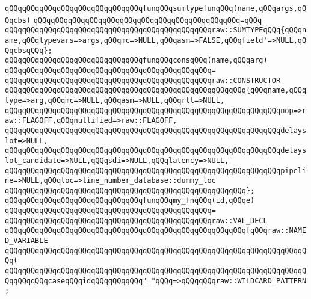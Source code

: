 \newline
\verb|qQQqqQQqqQQqqQQqqQQqqQQqqQQqqQQqfunqQQqsumtypefunqQQq(name,qQQqargs,qQQqcbs)|\newline
\verb|qQQqqQQqqQQqqQQqqQQqqQQqqQQqqQQqqQQqqQQqqQQqqQQq=qQQq|\newline
\verb|qQQqqQQqqQQqqQQqqQQqqQQqqQQqqQQqqQQqqQQqqQQqqQQqraw::SUMTYPEqQQq{qQQqname,qQQqtypevars=>args,qQQqmc=>NULL,qQQqasm=>FALSE,qQQqfield'=>NULL,qQQqcbsqQQq};|\newline
\newline
\verb|qQQqqQQqqQQqqQQqqQQqqQQqqQQqqQQqfunqQQqconsqQQq(name,qQQqarg)|\newline
\verb|qQQqqQQqqQQqqQQqqQQqqQQqqQQqqQQqqQQqqQQqqQQqqQQq=|\newline
\verb|qQQqqQQqqQQqqQQqqQQqqQQqqQQqqQQqqQQqqQQqqQQqqQQqraw::CONSTRUCTOR|\newline
\verb|qQQqqQQqqQQqqQQqqQQqqQQqqQQqqQQqqQQqqQQqqQQqqQQqqQQqqQQq{qQQqname,qQQqtype=>arg,qQQqmc=>NULL,qQQqasm=>NULL,qQQqrtl=>NULL,|\newline
\verb|qQQqqQQqqQQqqQQqqQQqqQQqqQQqqQQqqQQqqQQqqQQqqQQqqQQqqQQqqQQqqQQqnop=>raw::FLAGOFF,qQQqnullified=>raw::FLAGOFF,|\newline
\verb|qQQqqQQqqQQqqQQqqQQqqQQqqQQqqQQqqQQqqQQqqQQqqQQqqQQqqQQqqQQqqQQqdelayslot=>NULL,|\newline
\verb|qQQqqQQqqQQqqQQqqQQqqQQqqQQqqQQqqQQqqQQqqQQqqQQqqQQqqQQqqQQqqQQqdelayslot_candidate=>NULL,qQQqsdi=>NULL,qQQqlatency=>NULL,|\newline
\verb|qQQqqQQqqQQqqQQqqQQqqQQqqQQqqQQqqQQqqQQqqQQqqQQqqQQqqQQqqQQqqQQqpipeline=>NULL,qQQqloc=>line_number_database::dummy_loc|\newline
\verb|qQQqqQQqqQQqqQQqqQQqqQQqqQQqqQQqqQQqqQQqqQQqqQQqqQQqqQQq};|\newline
\newline
\verb|qQQqqQQqqQQqqQQqqQQqqQQqqQQqqQQqfunqQQqmy_fnqQQq(id,qQQqe)|\newline
\verb|qQQqqQQqqQQqqQQqqQQqqQQqqQQqqQQqqQQqqQQqqQQqqQQq=|\newline
\verb|qQQqqQQqqQQqqQQqqQQqqQQqqQQqqQQqqQQqqQQqqQQqqQQqraw::VAL_DECL|\newline
\verb|qQQqqQQqqQQqqQQqqQQqqQQqqQQqqQQqqQQqqQQqqQQqqQQqqQQqqQQq[qQQqraw::NAMED_VARIABLE|\newline
\verb|qQQqqQQqqQQqqQQqqQQqqQQqqQQqqQQqqQQqqQQqqQQqqQQqqQQqqQQqqQQqqQQqqQQqqQQq(|\newline
\verb|qQQqqQQqqQQqqQQqqQQqqQQqqQQqqQQqqQQqqQQqqQQqqQQqqQQqqQQqqQQqqQQqqQQqqQQqqQQqqQQqcaseqQQqidqQQqqQQqqQQq"_"qQQq=>qQQqqQQqraw::WILDCARD_PATTERN;|\newline
